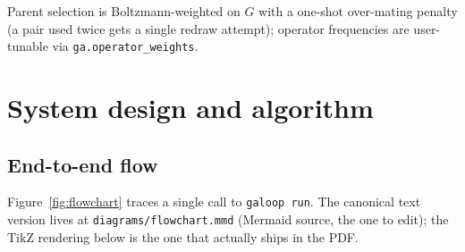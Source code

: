 \documentclass[11pt,letterpaper]{article}
\begin{document}
Parent selection is Boltzmann-weighted on $G$ with a one-shot
over-mating penalty (a pair used twice gets a single redraw attempt);
operator frequencies are user-tunable via \texttt{ga.operator\_weights}.

\section{System design and algorithm}
\label{sec:design}

\subsection{End-to-end flow}
\label{sec:flow}

Figure~\ref{fig:flowchart} traces a single call to \texttt{galoop run}.
The canonical text version lives at
\texttt{diagrams/flowchart.mmd} (Mermaid source, the one to edit); the
TikZ rendering below is the one that actually ships in the PDF.
\end{document}
